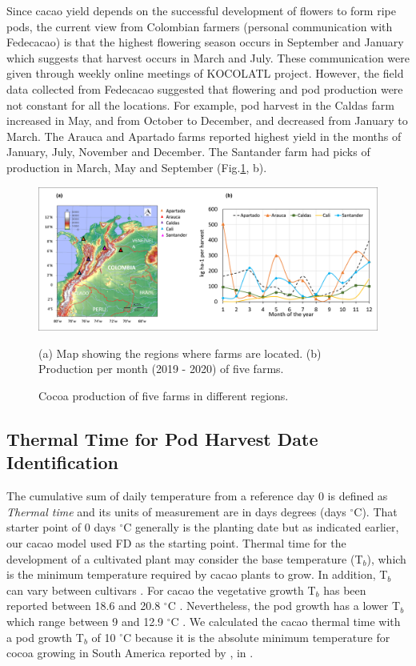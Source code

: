 \documentclass[gene,journal,article,submit,moreauthors,pdftex]{Definitions/mdpi}
\begin{document}
Since cacao yield depends on the successful development of flowers to form ripe pods, the current view from Colombian farmers (personal communication with Fedecacao)  is that the highest flowering season occurs in September and January which suggests that harvest occurs in March and July. These communication were given through weekly online meetings of KOCOLATL project.  However, the field data collected from Fedecacao suggested that flowering and pod production were not constant for all the locations. For example, pod harvest in the Caldas farm increased in May, and from October to December, and decreased from January to March.  The Arauca and Apartado farms reported highest yield in the months of January, July, November and December. The Santander farm had picks of production in March, May and September (Fig.\ref{fig:yield}, b). 


\begin{figure}[h]
	\centering
	\includegraphics[scale=0.3]{images/map.png}\\
	\caption{\footnotesize {Cocoa production  of five farms in different regions.\\}}
	\label{fig:yield}
	{\footnotesize (a) Map showing the regions where farms are located.  (b) Production per month (2019 - 2020) of five farms.}\\
\end{figure}


\subsection{Thermal Time for Pod Harvest Date Identification}

The cumulative sum of daily temperature from a reference day 0 is defined as \emph{Thermal time} and  its units of measurement are in days degrees (days $^\circ$C). That starter point of 0 days $^\circ$C generally is the planting date \citep{Ritchie1991} but as indicated earlier, our cacao model used FD as the starting point. Thermal time for the development of a cultivated plant may consider the base temperature (T$_{b}$), which is the minimum temperature required by cacao plants to grow. In addition, T$_{b}$ can vary between cultivars \citep{Slafer1995, Daymond2008}. For cacao the vegetative growth T$_{b}$ has been reported between 18.6 and 20.8 $^\circ$C \citep{Daymond2008}. Nevertheless, the pod growth  has a lower T$_{b}$ which range between 9 and 12.9 $^\circ$C \citep{Daymond2008, lahive2019}. We calculated the cacao thermal time with a pod growth T$_{b}$ of 10 $^\circ$C because it is the absolute minimum temperature for cocoa growing in South America reported by \cite{Erneholm1948}, in \citep{lahive2019}.    
 
\end{document}
